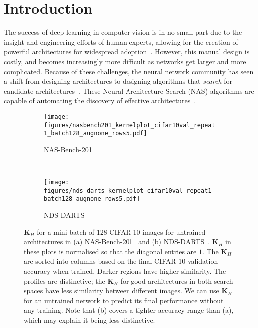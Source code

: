\documentclass{article}
\newcommand{\maybebf}[0]{}
\newcommand{\matr}[1]{\mathbf{#1}}
\begin{document}
\section{Introduction}
The success of deep learning in computer vision is in no small part due to the insight and engineering efforts of human experts, allowing for the creation of powerful architectures for widespread adoption~\citep{krizhevsky2012imagnet,simonyan2015very,he2016deep,szegedy2016rethinking,huang2017densely}. However, this manual design is costly, and becomes increasingly more difficult as networks get larger and more complicated. Because of these challenges, the neural network community has seen a shift from designing architectures to designing algorithms that {\it search} for candidate architectures~\citep{elsken2019neural,wistuba2019survey}. These Neural Architecture Search (NAS) algorithms are capable of automating the discovery of effective architectures~\citep{zoph2017neural,zoph2018learning,pham2018efficient,tan2019mnasnet,liu2019darts,real2019regularized}.

\begin{figure*}[!h]

\centering
    \begin{subfigure}{.49\textwidth}
    \texttt{[image: figures/nasbench201\_kernelplot\_cifar10val\_repeat1\_batch128\_augnone\_rows5.pdf]}
    \caption{NAS-Bench-201}
    \label{fig:activationhamming201}
    \end{subfigure}~
    \begin{subfigure}{.49\textwidth}
    \texttt{[image: figures/nds\_darts\_kernelplot\_cifar10val\_repeat1\_batch128\_augnone\_rows5.pdf]}
    \caption{NDS-DARTS}
    \label{fig:activationhammingdarts}
    \end{subfigure}


\caption{{\color{black} $\matr{K}_H$ for a mini-batch of 128 CIFAR-10 images for {\maybebf untrained} architectures in (a) NAS-Bench-201~\citep{Dong2020NAS-Bench-201} and (b) NDS-DARTS~\citep{radosavovic2019network}. $\matr{K}_H$ in these plots is normalised so that the diagonal entries are $1$. The $\matr{K}_H$ are sorted into columns based on the final CIFAR-10 validation accuracy {\maybebf when trained}. Darker regions have higher similarity. The profiles are distinctive; the $\matr{K}_H$ for good architectures in both search spaces have less similarity between different images. We can use $\matr{K}_H$ for an untrained network to predict its final performance without any training. Note that (b) covers a tighter accuracy range than (a), which may explain it being less distinctive.}}
    \label{fig:normhamming} 
\end{figure*}
\end{document}
